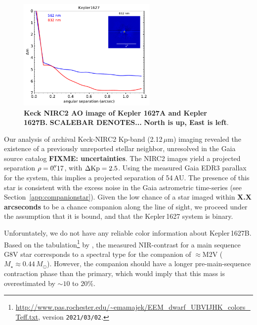 \documentclass[12pt,modern,twocolumn,tighten]{aastex63}
\begin{document}
\begin{figure}[t]
	\begin{center}
		\leavevmode
		\includegraphics[width=0.6\textwidth]{Kepler1627_20210624_562_832_final.pdf}
	\end{center}
	\vspace{-0.7cm}
	\caption{
    {\bf Keck NIRC2 AO image of Kepler 1627A and Kepler 1627B.}  
    {\bf SCALEBAR DENOTES...}
    {\bf North is up, East is left}.
    \label{fig:ao}
	}
\end{figure}

Our analysis of archival Keck-NIRC2 Kp-band (2.12\,$\mu $m) imaging
revealed the existence of a previously unreported stellar neighbor,
unresolved in the Gaia source catalog {\bf FIXME: uncertainties}.  The
NIRC2 images yield a projected separation $\rho=0\mbox{$.\!\!^{\prime\prime}$}17$, with
$\Delta {\rm Kp} = 2.5$.  Using the measured Gaia EDR3 parallax for
the system, this implies a projected separation of 54\,AU.  The
presence of this star is consistent with the excess noise in the Gaia
astrometric time-series (see Section~\ref{app:companionstar}).  Given
the low chance of a star imaged within {\bf X.X arcseconds} to be a
chance companion along the line of sight, we proceed under the
assumption that it is bound, and that the Kepler\,1627 system is
binary.

Unforuntately, we do not have any reliable color information about
Kepler\,1627B.  Based on the
tabulation\footnote{\url{http://www.pas.rochester.edu/~emamajek/EEM_dwarf_UBVIJHK_colors_Teff.txt},
version \texttt{2021/03/02}.} by \citet{pecaut_mamajek_2013}, the
measured NIR-contrast for a main sequence G8V star corresponds to a
spectral type for the companion of $\approx$M2V ($M_\star \approx
0.44\,M_\odot$).  However, the companion should have a longer
pre-main-sequence contraction phase than the primary, which would
imply that this mass is overestimated by $\sim10$ to $20\%$.
\end{document}
